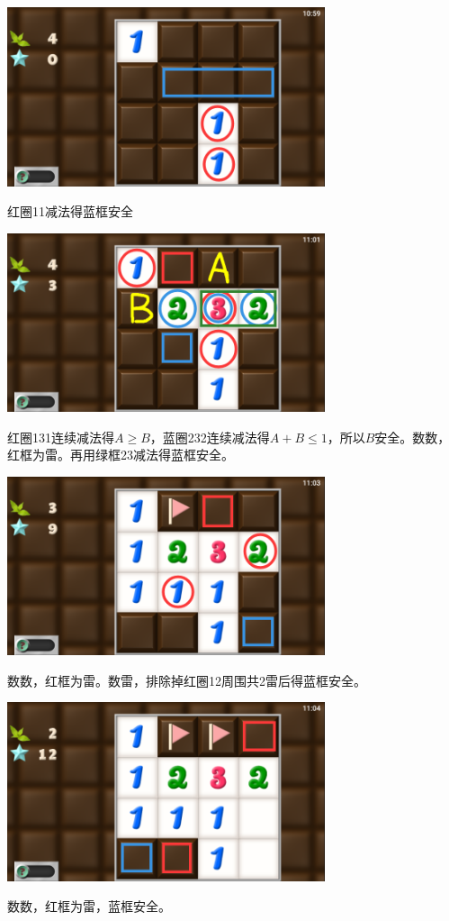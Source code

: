 \subsection{} %
\begin{center}
    \includegraphics[width=0.7\textwidth]{puzzle/125-1.png}
\end{center}
红圈11减法得蓝框安全
\begin{center}
    \includegraphics[width=0.7\textwidth]{puzzle/125-2.png}
\end{center}
红圈131连续减法得$A\ge B$，蓝圈232连续减法得$A+B\le 1$，所以$B$安全。数数，红框为雷。再用绿框23减法得蓝框安全。
\begin{center}
    \includegraphics[width=0.7\textwidth]{puzzle/125-3.png}
\end{center}
数数，红框为雷。数雷，排除掉红圈12周围共2雷后得蓝框安全。
\begin{center}
    \includegraphics[width=0.7\textwidth]{puzzle/125-4.png}
\end{center}
数数，红框为雷，蓝框安全。

